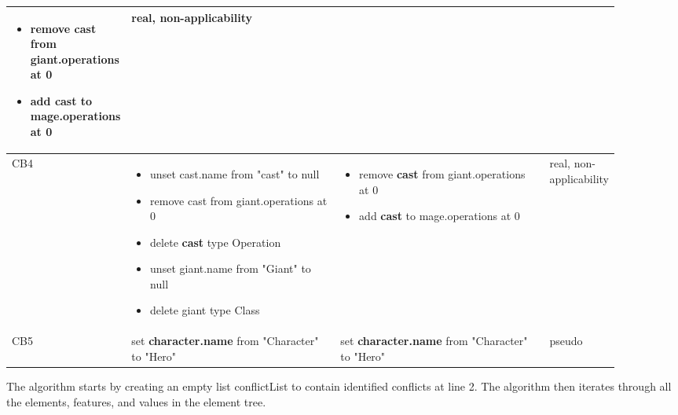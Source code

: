 \begin{table}[ht]
\begin{tabular}{|p{0.04\linewidth}|p{0.38\linewidth}|p{0.38\linewidth}|
		p{0.1\linewidth}|}
\begin{minipage}[t]{\linewidth}
\begin{itemize}[leftmargin=0pt]
			\item[] remove cast from \textbf{giant}.operations at 0
			\item[] add cast to mage.operations at 0
		\end{itemize}
	\end{minipage}
	& 
	real, non-applicability\\
	\hline
	CB4 & 
	\begin{minipage}[t]{\linewidth}
		\raggedright
		\begin{itemize}[leftmargin=0pt]
			\setlength
			\item[] unset cast.name from "cast" to null
			\item[] remove cast from giant.operations at 0
			\item[] delete \textbf{cast} type Operation
			\item[] unset giant.name from "Giant" to null
			\item[] delete giant type Class
		\end{itemize}
	\end{minipage}
	& 
	\begin{minipage}[t]{\linewidth}
		\raggedright
		\begin{itemize}[leftmargin=0pt]
			\setlength
			\item[] remove \textbf{cast} from giant.operations at 0
			\item[] add \textbf{cast} to mage.operations at 0
		\end{itemize}
	\end{minipage}
	& 
	real, non-applicability\\
	\hline
	CB5 & 
	set \textbf{character.name} from "Character" to "Hero" & 
	set \textbf{character.name} from "Character" to "Hero" & 
	pseudo\\ 
	\hline
\end{tabular}
\end{table}


The algorithm starts by creating an empty list \textsf{conflictList} to contain identified conflicts at line 2. The algorithm then iterates through all the elements, features, and values in the element tree. 

